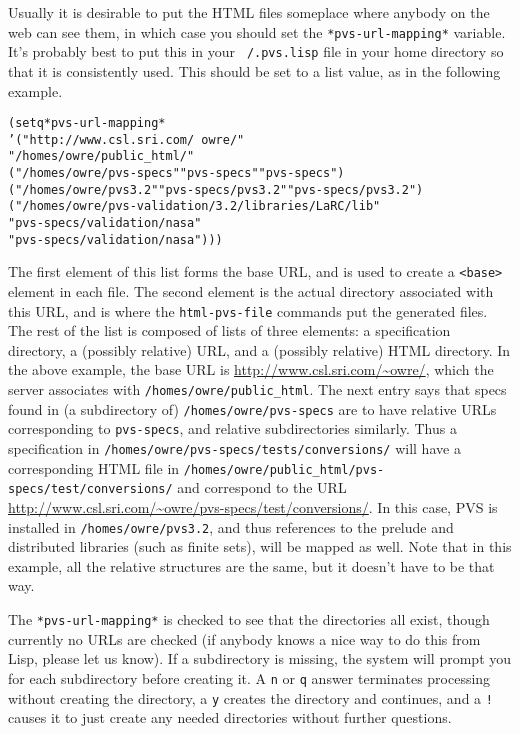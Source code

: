 Usually it is desirable to put the HTML files someplace where anybody
on the web can see them, in which case you should set the
\texttt{*pvs-url-mapping*} variable.  It's probably best to put this in
your \texttt{~/.pvs.lisp} file in your home directory so that it is
consistently used.  This should be set to a list value, as in the
following example.
\begin{alltt}
  (setq *pvs-url-mapping*
        '("http://www.csl.sri.com/~owre/"
          "/homes/owre/public_html/"
          ("/homes/owre/pvs-specs" "pvs-specs" "pvs-specs")
          ("/homes/owre/pvs3.2" "pvs-specs/pvs3.2" "pvs-specs/pvs3.2")
          ("/homes/owre/pvs-validation/3.2/libraries/LaRC/lib"
           "pvs-specs/validation/nasa"
           "pvs-specs/validation/nasa")))
\end{alltt}
The first element of this list forms the base URL, and is used to
create a \texttt{<base>} element in each file.  The second element is
the actual directory associated with this URL, and is where the
\texttt{html-pvs-file} commands put the generated files.  The rest of
the list is composed of lists of three elements: a specification
directory, a (possibly relative) URL, and a (possibly relative) HTML
directory.  In the above example, the base URL is
\url{http://www.csl.sri.com/~owre/}, which the server associates with
\texttt{/homes/owre/public\_html}.  The next entry says that specs found
in (a subdirectory of) \texttt{/homes/owre/pvs-specs} are to have
relative URLs corresponding to \texttt{pvs-specs}, and relative
subdirectories similarly.  Thus a specification in
\texttt{/homes/owre/pvs-specs/tests/conversions/} will have a
corresponding HTML file in
\texttt{/homes/owre/public\_html/pvs-specs/test/conversions/} and
correspond to the URL
\url{http://www.csl.sri.com/~owre/pvs-specs/test/conversions/}.
In this case, PVS is installed in \texttt{/homes/owre/pvs3.2}, and thus
references to the prelude and distributed libraries (such as finite
sets), will be mapped as well.  Note that in this example, all the
relative structures are the same, but it doesn't have to be that way.

The \texttt{*pvs-url-mapping*} is checked to see that the directories
all exist, though currently no URLs are checked (if anybody knows a
nice way to do this from Lisp, please let us know).  If a subdirectory
is missing, the system will prompt you for each subdirectory before
creating it.  A \texttt{n} or \texttt{q} answer terminates processing
without creating the directory, a \texttt{y} creates the
directory and continues, and a \texttt{!} causes it to just create any
needed directories without further questions.

